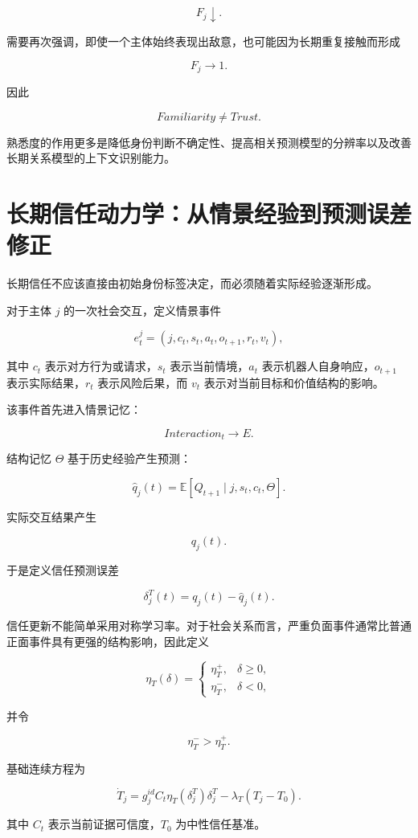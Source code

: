 \[
F_j\downarrow.
\]

需要再次强调，即使一个主体始终表现出敌意，也可能因为长期重复接触而形成

\[
F_j\rightarrow1.
\]

因此

\[
\boxed{
Familiarity\neq Trust.
}
\]

熟悉度的作用更多是降低身份判断不确定性、提高相关预测模型的分辨率以及改善长期关系模型的上下文识别能力。


\section{长期信任动力学：从情景经验到预测误差修正}

长期信任不应该直接由初始身份标签决定，而必须随着实际经验逐渐形成。

对于主体 $j$ 的一次社会交互，定义情景事件

\[
e_t^j
=
\left(
j,
c_t,
s_t,
a_t,
o_{t+1},
r_t,
v_t
\right),
\]

其中 $c_t$ 表示对方行为或请求，$s_t$ 表示当前情境，$a_t$ 表示机器人自身响应，$o_{t+1}$ 表示实际结果，$r_t$ 表示风险后果，而 $v_t$ 表示对当前目标和价值结构的影响。

该事件首先进入情景记忆：

\[
\boxed{
Interaction_t
\rightarrow
E.
}
\]

结构记忆 $\Theta$ 基于历史经验产生预测：

\[
\hat q_j(t)
=
\mathbb E
\left[
Q_{t+1}
\mid
j,s_t,c_t,\Theta
\right].
\]

实际交互结果产生

\[
q_j(t).
\]

于是定义信任预测误差

\[
\delta_j^T(t)
=
q_j(t)-\hat q_j(t).
\]

信任更新不能简单采用对称学习率。对于社会关系而言，严重负面事件通常比普通正面事件具有更强的结构影响，因此定义

\[
\eta_T(\delta)
=
\begin{cases}
\eta_T^+,
&
\delta\ge0,
\\
\eta_T^-,
&
\delta<0,
\end{cases}
\]

并令

\[
\eta_T^->\eta_T^+.
\]

基础连续方程为

\[
\dot T_j
=
g_j^{id}
C_t
\eta_T(\delta_j^T)
\delta_j^T
-
\lambda_T
(T_j-T_0).
\]

其中 $C_t$ 表示当前证据可信度，$T_0$ 为中性信任基准。


